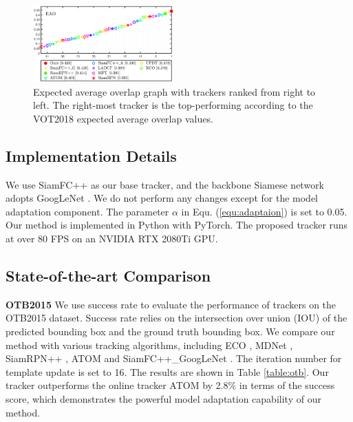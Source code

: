 \begin{figure}[t]
    \centering
    \includegraphics[width=0.48\textwidth]{Img/MTP/vot18/vot18_eao.png}
    \vspace{-0.3cm}
    \caption{Expected average overlap graph with trackers ranked from right to left. The right-most tracker is the top-performing according to the VOT2018 expected average overlap values.}
    \vspace{-0.3cm}
    \label{fig:eao}
\end{figure}

\subsection{Implementation Details}
We use SiamFC++ \cite{SiamFC++} as our base tracker, and the backbone Siamese network adopts GoogLeNet \cite{szegedy2015going}. We do not perform any changes except for the model adaptation component. The parameter $\alpha$ in Equ. (\ref{equ:adaptaion}) is set to 0.05. Our method is implemented in Python with PyTorch. The proposed tracker runs at over 80 FPS on an NVIDIA RTX 2080Ti GPU.

\subsection{State-of-the-art Comparison}
\textbf{OTB2015} We use success rate to evaluate the performance of trackers on the OTB2015 dataset. Success rate relies on the intersection over union (IOU) of the predicted bounding box and the ground truth bounding box. We compare our method with various tracking algorithms, including ECO \cite{danelljan2017eco}, MDNet \cite{nam2016learning}, SiamRPN++ \cite{li2019siamrpn++}, ATOM \cite{danelljan2019atom} and SiamFC++\_GoogLeNet \cite{SiamFC++}. The iteration number for template update is set to 16. The results are shown in Table \ref{table:otb}. Our tracker outperforms the online tracker ATOM by 2.8\% in terms of the success score, which demonstrates the powerful model adaptation capability of our method.

